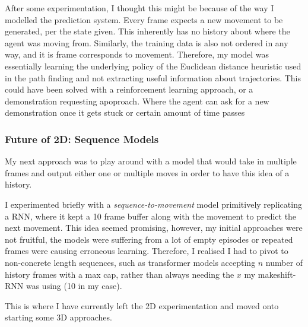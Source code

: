 After some experimentation, I thought this might be because of the way I modelled the prediction system. Every frame expects a new movement to be generated, per the state given. This inherently has no history about where the agent was moving from. Similarly, the training data is also not ordered in any way, and it is frame corresponds to movement. Therefore, my model was essentially learning the underlying policy of the Euclidean distance heuristic used in the path finding and not extracting useful information about trajectories. This could have been solved with a reinforcement learning approach, or a demonstration requesting apoproach. Where the agent can ask for a new demonstration once it gets stuck or certain amount of time passes 

\subsubsection{Future of 2D: Sequence Models}
My next approach was to play around with a model that would take in multiple frames and output either one or multiple moves in order to have this idea of a history.

I experimented briefly with a \emph{sequence-to-movement} model primitively replicating a RNN, where it kept a 10 frame buffer along with the movement to predict the next movement. This idea seemed promising, however, my initial approaches were not fruitful, the models were suffering from a lot of empty episodes or repeated frames were causing erroneous learning. Therefore, I realised I had to pivot to non-concrete length sequences, such as transformer models accepting $n$ number of history frames with a max cap, rather than always needing the $x$ my makeshift-RNN was using (10 in my case). 

This is where I have currently left the 2D experimentation and moved onto starting some 3D approaches.

